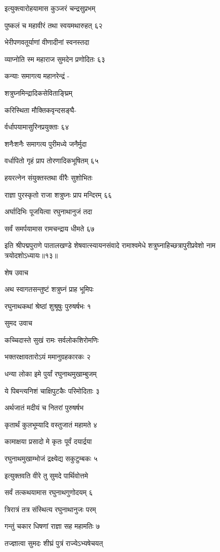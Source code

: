 इत्युक्त्वारोहयामास कुञ्जरं चन्द्रसुप्रभम्

पुष्कलं च महावीरं तथा स्वयमथारुहत् ६२

भेरीपणवतूर्याणां वीणादीनां स्वनस्तदा

व्याप्नोति स्म महाराज सुमदेन प्रणोदितः ६३

कन्याः समागत्य महानरेन्द्रं -

शत्रुघ्नमिन्द्रादिकसेविताङ्घ्रिम्

करिस्थिता मौक्तिकवृन्दसङ्घै-

र्वर्धापयामासुरिनप्रयुक्ताः ६४

शनैःशनैः समागत्य पुरीमध्ये जनैर्मुदा

वर्धापितो गृहं प्राप तोरणादिकभूषितम् ६५

हयरत्नेन संयुक्तस्तथा वीरैः सुशोभितः

राज्ञा पुरस्कृतो राजा शत्रुघ्नः प्राप मन्दिरम् ६६

अर्घादिभिः पूजयित्वा रघुनाथानुजं तदा

सर्वं समर्पयामास रामचन्द्राय धीमते ६७

इति श्रीपद्मपुराणे पातालखण्डे शेषवात्स्यायनसंवादे रामाश्वमेधे शत्रुघ्नाहिच्छत्रापुरीप्रवेशो नाम त्रयोदशोऽध्यायः॥१३॥


शेष उवाच

अथ स्वागतसन्तुष्टं शत्रुघ्नं प्राह भूमिपः

रघुनाथकथां श्रेष्ठां शुश्रूषुः पुरुषर्षभः १

सुमद उवाच

कच्चिदास्ते सुखं रामः सर्वलोकशिरोमणिः

भक्तरक्षावतारोऽयं ममानुग्रहकारकः २

धन्या लोका इमे पुर्यां रघुनाथमुखाम्बुजम्

ये पिबन्त्यनिशं चाक्षिपुटकैः परिमोदिताः ३

अर्थजातं मदीयं च नितरां पुरुषर्षभ

कृतार्थं कुलभूम्यादि वस्तुजातं महामते ४

कामाक्षया प्रसादो मे कृतः पूर्वं दयार्द्रया

रघुनाथमुखाम्भोजं द्रक्ष्येद्य सकुटुम्बकः ५

इत्युक्तवति वीरे तु सुमदे पार्थिवोत्तमे

सर्वं तत्कथयामास रघुनाथगुणोदयम् ६

त्रिरात्रं तत्र संस्थित्य रघुनाथानुजः परम्

गन्तुं चकार धिषणां राज्ञा सह महामतिः ७

तज्ज्ञात्वा सुमदः शीघ्रं पुत्रं राज्येऽभ्यषेचयत्

